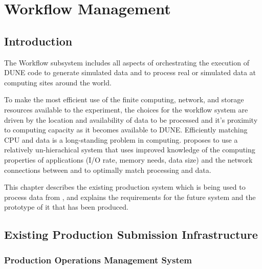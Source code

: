 \documentclass[../main-v1.tex]{subfiles}
\begin{document}
\chapter{Workflow Management }
\label{ch:wkflow}
\section{Introduction}
\label{sec:flow:intro} 

The Workflow subsystem includes all aspects of orchestrating the execution of DUNE code to generate simulated data and to process real or simulated data at computing sites around the world. 

To make the most efficient use of the finite computing, network, and storage resources available to the experiment, the choices for the workflow system %
are driven by the location and availability of data to be processed and it's %
 proximity to computing capacity as it becomes available to DUNE. Efficiently matching CPU and data is a long-standing problem in  computing.  proposes to use a relatively un-hierachical system that uses improved knowledge of the computing properties of applications (I/O rate, memory needs, data size) and the network connections between  and  to optimally match processing and data. 

This chapter describes the existing production system which is being used to process data from , and %
explains the requirements for the future system and the prototype of it that has been produced. %



\section{Existing Production Submission Infrastructure }
\label{sec:current}

\subsection{Production Operations Management System}
\label{subsec:jobsub}
\end{document}
